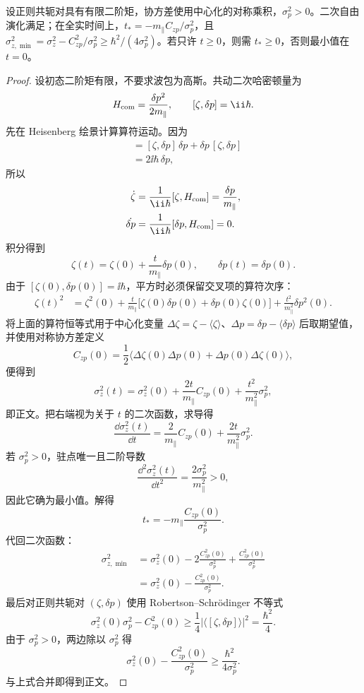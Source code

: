 \begin{proposition}[二次剪切的方差极小值]
设正则共轭对具有有限二阶矩，协方差使用中心化的对称乘积，$\sigma_p^2>0$。二次自由演化满足；在全实时间上，$t_*=-m_\parallel C_{zp}/\sigma_p^2$，且 $\sigma_{z,\min}^2=\sigma_z^2-C_{zp}^2/\sigma_p^2\ge\hbar^2/(4\sigma_p^2)$。若只许 $t\ge0$，则需 $t_*\ge0$，否则最小值在 $t=0$。
\end{proposition}
\begin{proof}
设初态二阶矩有限，不要求波包为高斯。共动二次哈密顿量为
\[
H_{\rm com}=\frac{\delta p^2}{2m_\parallel},
\qquad
[\zeta,\delta p]=\ii\hbar.
\]
先在 Heisenberg 绘景计算算符运动。因为
\begin{align*}
[\zeta,\delta p^2]
&=[\zeta,\delta p]\,\delta p
+\delta p\,[\zeta,\delta p]\\
&=2\ii\hbar\,\delta p,
\end{align*}
所以
\begin{align*}
\dot\zeta
&=\frac{1}{\ii\hbar}[\zeta,H_{\rm com}]
=\frac{\delta p}{m_\parallel},\\
\dot{\delta p}
&=\frac{1}{\ii\hbar}[\delta p,H_{\rm com}]=0.
\end{align*}
积分得到
\[
\zeta(t)=\zeta(0)+\frac{t}{m_\parallel}\delta p(0),
\qquad
\delta p(t)=\delta p(0).
\]
由于 $[\zeta(0),\delta p(0)]=\ii\hbar$，平方时必须保留交叉项的算符次序：
\begin{align*}
\zeta(t)^2
&=\zeta^2(0)
+\frac{t}{m_\parallel}
\bigl[\zeta(0)\delta p(0)+\delta p(0)\zeta(0)\bigr]
+\frac{t^2}{m_\parallel^2}\delta p^2(0).
\end{align*}
将上面的算符恒等式用于中心化变量 $\Delta\zeta=\zeta-\langle\zeta\rangle$、$\Delta p=\delta p-\langle\delta p\rangle$ 后取期望值，并使用对称协方差定义
\[
C_{zp}(0)=\frac12
\langle\Delta\zeta(0)\Delta p(0)+\Delta p(0)\Delta\zeta(0)\rangle,
\]
便得到
\[
\sigma_z^2(t)
=\sigma_z^2(0)
+\frac{2t}{m_\parallel}C_{zp}(0)
+\frac{t^2}{m_\parallel^2}\sigma_p^2,
\]
即正文。把右端视为关于 $t$ 的二次函数，求导得
\[
\frac{\dd\sigma_z^2(t)}{\dd t}
=\frac{2}{m_\parallel}C_{zp}(0)
+\frac{2t}{m_\parallel^2}\sigma_p^2.
\]
若 $\sigma_p^2>0$，驻点唯一且二阶导数
\[
\frac{\dd^2\sigma_z^2(t)}{\dd t^2}
=\frac{2\sigma_p^2}{m_\parallel^2}>0,
\]
因此它确为最小值。解得
\[
t_*=-m_\parallel\frac{C_{zp}(0)}{\sigma_p^2}.
\]
代回二次函数：
\begin{align*}
\sigma_{z,\min}^2
&=\sigma_z^2(0)
-2\frac{C_{zp}^2(0)}{\sigma_p^2}
+\frac{C_{zp}^2(0)}{\sigma_p^2}\\
&=\sigma_z^2(0)-\frac{C_{zp}^2(0)}{\sigma_p^2}.
\end{align*}
最后对正则共轭对 $(\zeta,\delta p)$ 使用 Robertson--Schr\"odinger 不等式
\[
\sigma_z^2(0)\sigma_p^2-C_{zp}^2(0)
\ge\frac14|\langle[\zeta,\delta p]\rangle|^2
=\frac{\hbar^2}{4}.
\]
由于 $\sigma_p^2>0$，两边除以 $\sigma_p^2$ 得
\[
\sigma_z^2(0)-\frac{C_{zp}^2(0)}{\sigma_p^2}
\ge\frac{\hbar^2}{4\sigma_p^2}.
\]
与上式合并即得到正文。
\end{proof}


